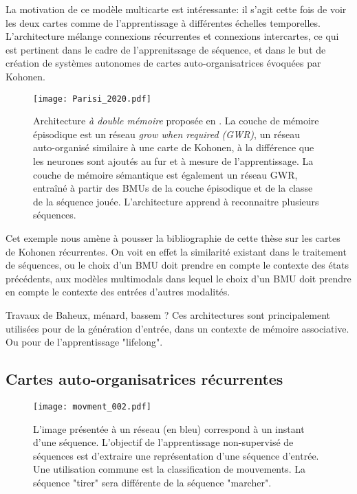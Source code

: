 \documentclass[../main]{subfiles}
\begin{document}
La motivation de ce modèle multicarte est intéressante: il s'agit cette fois de voir les deux cartes comme de l'apprentissage à différentes échelles temporelles. L'architecture mélange connexions récurrentes et connexions intercartes, ce qui est pertinent dans le cadre de l'apprenitssage de séquence, et dans le but de création de systèmes autonomes de cartes auto-organisatrices évoquées par Kohonen.


\begin{figure}
    \centering
    \texttt{[image: Parisi\_2020.pdf]}
    \caption{Architecture \emph{à double mémoire} proposée en \cite{parisiLL}. La couche de mémoire épisodique est un réseau \emph{grow when required (GWR)}, un réseau auto-organisé similaire à une carte de Kohonen, à la différence que les neurones sont ajoutés au fur et à mesure de l'apprentissage. La couche de mémoire sémantique est également un réseau GWR, entraîné à partir des BMUs de la couche épisodique et de la classe de la séquence jouée. L'architecture apprend à reconnaitre plusieurs séquences.\label{fig:gdm_parisi}}
\end{figure}

Cet exemple nous amène à pousser la bibliographie de cette thèse sur les cartes de Kohonen récurrentes. On voit en effet la similarité existant dans le traitement de séquences, ou le choix d'un BMU doit prendre en compte le contexte des états précédents, aux modèles multimodals dans lequel le choix d'un BMU doit prendre en compte le contexte des entrées d'autres modalités.



Travaux de Baheux, ménard, bassem ? 
Ces architectures sont principalement utilisées pour de la génération d'entrée, dans un contexte de mémoire associative. Ou pour de l'apprentissage "lifelong".

\subsection{Cartes auto-organisatrices récurrentes}
\begin{figure}
   \centering\texttt{[image: movment\_002.pdf]}
   \caption{L'image présentée à un réseau (en bleu) correspond à un instant d'une séquence. L'objectif de l'apprentissage non-supervisé de séquences est d'extraire une représentation d'une séquence d'entrée. Une utilisation commune est la classification de mouvements. La séquence "tirer" sera différente de la séquence "marcher".\label{fig:mouvement}}
\end{figure}
\end{document}
